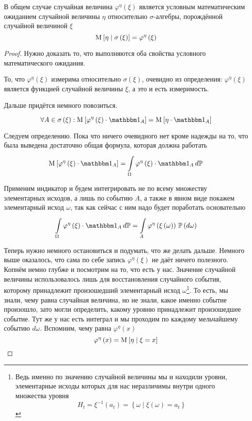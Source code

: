 \begin{lemma}
    В общем случае случайная величина $\varphi^{\eta}\left( \xi \right)$
    является условным математическим ожиданием случайной величины $\eta$
    относительно $\sigma$-алгебры, порождённой случайной величиной $\xi$
    $$\mathrm{M}_{} \left[  \eta \mid \sigma\left( \xi \right)  \right]
        = \varphi^{\eta}\left( \xi \right)$$
\end{lemma}
\begin{proof}
Нужно доказать то, что выполняются оба свойства
условного математического ожидания.

То, что $\varphi^{\eta}\left( \xi \right)$ измерима
относительно $\sigma\left( \xi \right)$,
очевидно из определения: $\varphi^{\eta}\left( \xi \right)$ является функцией
случайной величины $\xi$, а это и есть измеримость.

Дальше придётся немного повозиться.

$$\forall A \in \sigma\left( \xi \right):
    \Mean{ \varphi^{\eta}\left( \xi \right) \cdot \indicatorof{A} }
        =\Mean{ \eta \cdot \indicatorof{A} }$$

Следуем определению. Пока что ничего очевидного нет кроме надежды на то,
что была выведена достаточно общая формула, которая должна работать
$$\Mean{ \varphi^{\eta}\left( \xi \right) \cdot \indicatorof{A} }
    = \integrall{\Omega}{d\mathbb{P}}{
    \varphi^{\eta}\left( \xi \right) \cdot \indicatorof{A}}$$

Применим индикатор и будем интегрировать
не по всему множеству элементарных исходов, а лишь по событию $A$,
а также в явном виде покажем элементарный исход $\omega$,
так как сейчас с ним надо будет поработать основательно
\begin{equation}\label{conditionalExpectationIntegralStart}
    \integrall{\Omega}{d\mathbb{P}}{
        \varphi^{\eta}\left( \xi \right) \cdot \indicatorof{A}}
    = \integrall{A}{\probability{d\omega}}{
        \varphi^{\eta}\left( \xi\left( \omega \right) \right)}
\end{equation}

Теперь нужно немного остановиться и подумать, что же делать дальше.
Немного выше оказалось, что сама по себе запись $\varphi^{\eta}\left( \xi \right)$
не даёт ничего полезного.
Копнём немно глубже и посмотрим на то, что есть у нас.
Значение случайной величины использовалось лишь
для восстановления случайного события,
которому принадлежит произошедший элементарный исход $\omega$\footnote{Ведь
именно по значению случайной величины мы и находили уровни, элементарные исходы
которых для нас неразличимы внутри одного множества уровня
$$H_t = \xi^{-1}\left( a_t \right)
    = \left\{ \omega \mid \xi\left( \omega \right) = a_t \right\}$$}.
То есть, мы знали, чему равна случайная величина,
но не знали, какое именно событие произошло,
зато могли определить, какому уровню принадлежит произошедшее событие.
Тут же у нас есть интеграл
и мы проходим по каждому мельчайшему событию $d\omega$.
Вспомним, чему равна $\varphi^{\eta}\left( x \right)$
$$\varphi^{\eta}\left( x \right) = \mathrm{M}_{} \left[ \eta \mid \xi = x \right]$$


\end{proof}
